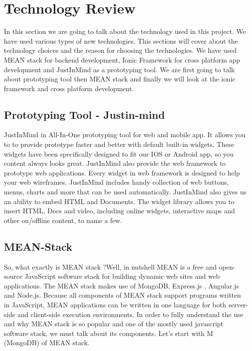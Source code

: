 \chapter{Technology Review}
	In this section we are going to talk about the technology used in this project.  We have used various types of new technologies. This sections will cover about the technology choices and the reason for choosing the technologies. We have used MEAN stack for backend development, Ionic Framework for cross platform app development and JustInMind as a prototyping tool.  We are first going to talk about prototyping tool then MEAN stack and finally we will look at the ionic framework and cross platform development. 

	\section{Prototyping Tool - Justin-mind}
	 JustInMind  in All-In-One prototyping tool for web and mobile app. \cite{JustInMind} It allows you to to provide prototype faster and better with default built-in widgets. These widgets have been specifically designed to fit our IOS or Android app, so you content always looks great.  JustInMind also provide the web framework to prototype web applications. Every widget in web framework is designed to help your web wireframes. JustInMind includes handy collection of web buttons, menus, charts  and more that can be used automatically.  JustInMind also gives us an ability to embed HTML and Documents. The widget library allows you to insert HTML, Docs and video, including online widgets, interactive maps and other on/offline content, to name a few. 
	 
	\section{MEAN-Stack}
	So, what exactly is MEAN stack ?Well, in nutshell \cite{Mean-Stack} MEAN is a free and open-source JavaScript software stack for building dynamic web sites and web applications. The MEAN stack makes use of MongoDB, Express.js , Angular.js and Node.js. Because all components of MEAN stack support programs written in JavaScript, MEAN applications can be written in one language for both server-side and  client-side execution environments. In order to fully understand the use and why MEAN stack is so popular and one of the mostly used javascript software stack, we must talk about its components. Let's start with M (MongoDB) of MEAN stack.
	
